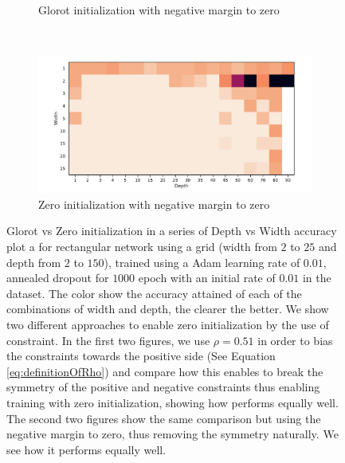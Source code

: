 \begin{figure}
\begin{subfigure}[b]{0.2\textwidth}
        \caption{Glorot initialization with negative margin to zero}
        \label{fig:moons_glorot_nm0}
    \end{subfigure}
    ~ %
    \centering
    \begin{subfigure}[b]{0.2\textwidth}
        \includegraphics[width=\textwidth]{img/moons_grid/acc-sep-up-0-0001-nm-0.pdf}
        \caption{Zero initialization with negative margin to zero}
        \label{fig:moons_zeros_nm0}
    \end{subfigure}
    
  \caption{Glorot vs Zero initialization in a series of Depth vs Width accuracy plot a for rectangular network using a grid (width from $2$ to $25$ and depth from $2$ to $150$),  trained using a Adam learning rate of $0.01$, annealed dropout for $1000$ epoch with an initial rate of $0.01$ in the \moons dataset. The color show the accuracy attained of each of the combinations of width and depth, the clearer the better. We show two different approaches to enable zero initialization by the use of \SepUnitPoint constraint. In the first two figures, we use $\rho = 0.51$ in order to bias the constraints towards the positive side (See Equation \ref{eq:definitionOfRho}) and compare how this enables to break the symmetry of the positive and negative constraints thus enabling training with zero initialization, showing how performs equally well. The second two figures show the same comparison but using the negative margin to zero, thus removing the symmetry naturally. We see how it performs equally well.
  }
  \label{fig:moons_grid_zero} 
\end{figure}
